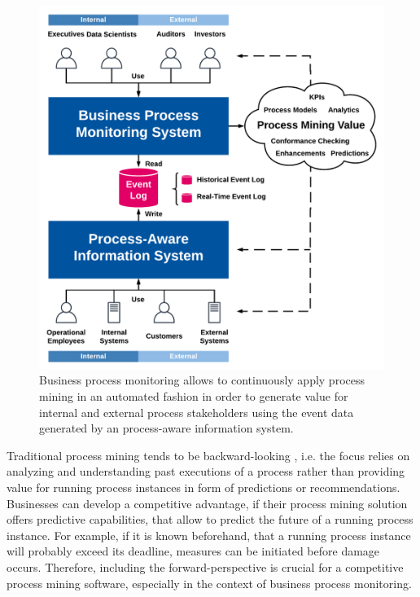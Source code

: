 \begin{figure}[htbp!]
	\centering
	\includegraphics[width=\textwidth]{figures/process-monitoring}
	\caption[Process mining in the context of business process monitoring]{Business process monitoring allows to continuously apply process mining in an automated fashion in order to generate value for internal and external process stakeholders using the event data generated by an process-aware information system.}
	\label{fig:process-monitoring}
\end{figure}

Traditional process mining tends to be backward-looking \cite{DBLP:conf/scsc/Aalst18}, i.e. the focus relies on analyzing and understanding past executions of a process rather than providing value for running process instances in form of predictions or recommendations.
Businesses can develop a competitive advantage, if their process mining solution offers predictive capabilities, that allow to predict the future of a running process instance.
For example, if it is known beforehand, that a running process instance will probably exceed its deadline, measures can be initiated before damage occurs.
Therefore, including the forward-perspective is crucial for a competitive process mining software, especially in the context of business process monitoring.

